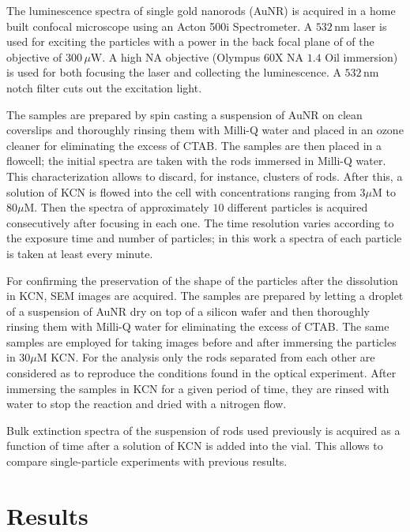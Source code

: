 \documentclass{article}
\begin{document}
The luminescence spectra of single gold nanorods (AuNR) is acquired in a home
built confocal microscope using an Acton 500i Spectrometer. A $532\,\textrm{nm}$
laser is used for exciting the particles with a power in the back focal plane of
of the objective of $300\,\mu\textrm{W}$. A high NA objective (Olympus $60$X NA
$1.4$ Oil immersion) is used for both focusing the laser and collecting the
luminescence. A $532\,\textrm{nm}$ notch filter cuts out the excitation light.

The samples are prepared by spin casting a suspension of AuNR on clean
coverslips and thoroughly rinsing them  with Milli-Q water and placed in an
ozone cleaner for eliminating the excess of CTAB. The samples are then placed in
a flowcell; the initial spectra are taken with the rods immersed in Milli-Q
water. This characterization allows to discard, for instance, clusters of rods.
After this, a solution of KCN is flowed into the cell with concentrations
ranging from $3\mu\textrm{M}$ to $80\mu\textrm{M}$. Then the spectra of
approximately $10$ different particles is acquired consecutively after focusing
in each one. The time resolution varies according to the exposure time and
number of particles; in this work a spectra of each particle is taken at least
every minute.

For confirming the preservation of the shape of the particles after the
dissolution in KCN, SEM images are acquired. The samples are prepared by letting
a droplet of a suspension of AuNR dry on top of a silicon wafer and then
thoroughly rinsing them with Milli-Q water for eliminating the excess of CTAB.
The same samples are employed for taking images before and after immersing the
particles in $30\mu\textrm{M}$ KCN. For the analysis only the rods separated
from each other are considered as to reproduce the conditions found in the
optical experiment. After immersing the samples in KCN for a given period of
time, they are rinsed with water to stop the reaction and dried with a nitrogen
flow.

Bulk extinction spectra of the suspension of rods used previously is acquired as
a function of time after a solution of KCN is added into the vial. This allows
to compare single-particle experiments with previous results. 

\section{Results}
\end{document}
